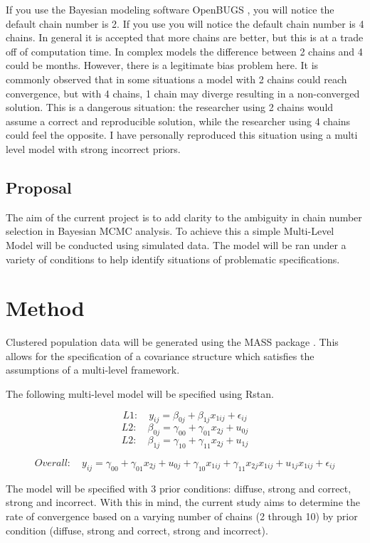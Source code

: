 \documentclass[apa6]{article}
\begin{document}
If you use the Bayesian modeling software OpenBUGS \cite{spiegelhalter2007openbugs}, you will notice the default chain number is 2. If you use \cite{Rstan} you will notice the default chain number is 4 chains. In general it is accepted that more chains are better, but this is at a trade off of computation time. In complex models the difference between 2 chains and 4 could be months. However, there is a legitimate bias problem here. It is commonly observed that in some situations a model with 2 chains could reach convergence, but with 4 chains, 1 chain may diverge resulting in a non-converged solution. This is a dangerous situation: the researcher using 2 chains would assume a correct and reproducible solution, while the researcher using 4 chains could feel the opposite. I have personally reproduced this situation using a multi level model with strong incorrect priors. 


\subsection{Proposal}
The aim of the current project is to add clarity to the ambiguity in chain number selection in Bayesian MCMC analysis. To achieve this a simple Multi-Level Model will be conducted using simulated data. The model will be ran under a variety of conditions to help identify situations of problematic specifications. 

\section{Method}

Clustered population data will be generated using the MASS package \cite{MASS}. This allows for the specification of a covariance structure which satisfies the assumptions of a multi-level framework.


The following multi-level model will be specified using Rstan.

$$L1: \quad y_{ij} = \beta_{0j} + \beta_{1j}x_{1ij} + \epsilon_{ij} $$
$$L2: \quad \beta_{0j} = \gamma_{00} + \gamma_{01}x_{2j} + u_{0j}$$
$$L2: \quad \beta_{1j} = \gamma_{10} + \gamma_{11}x_{2j} + u_{1j}$$

$$Overall: \quad y_{ij} = \gamma_{00} + \gamma_{01}x_{2j} + u_{0j} + \gamma_{10}x_{1ij} +  \gamma_{11}x_{2j}x_{1ij} +u_{1j}x_{1ij} + \epsilon_{ij}$$


The model will be specified with 3 prior conditions: diffuse, strong and correct, strong and incorrect. With this in mind, the current study aims to determine the rate of convergence based on a varying number of chains (2 through 10) by prior condition (diffuse, strong and correct, strong and incorrect).



{}

\end{document}
